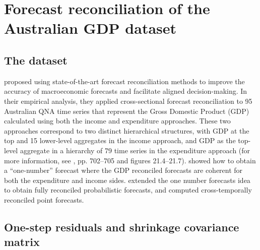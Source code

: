 \documentclass[a4paper,11pt]{article}
\theoremstyle{definition}
\begin{document}
\begin{table}[H]
	\centering
	\begingroup
	\fontsize{9}{11}\selectfont
	
	\endgroup
	\caption{Simulation experiment. ES ratio indices defined in Section 5. %
	Approaches performing worse than the benchmark (bootstrap base forecasts, ctjb) are highlighted in red, the best for each column is marked in bold, and the overall lowest value is highlighted in blue. The reconciliation approaches are described in Table 2.}
	\label{tab:ar2es_app_shr}
\end{table}

\newpage
\section{Forecast reconciliation of the Australian GDP dataset}

\subsection{The dataset}
\cite{athanasopoulos2020} proposed using state-of-the-art forecast reconciliation methods to improve the accuracy of macroeconomic forecasts and facilitate aligned decision-making. 
In their empirical analysis, they applied cross-sectional forecast reconciliation to 95 Australian QNA time series that represent the Gross Domestic Product (GDP) calculated using both the income and expenditure approaches. These two approaches correspond to two distinct hierarchical structures, with GDP at the top and 15 lower-level aggregates in the income approach, and GDP as the top-level aggregate in a hierarchy of 79 time series in the expenditure approach (for more information, see \citealp{athanasopoulos2020}, pp. 702--705 and figures 21.4--21.7).
\cite{bisaglia2020} showed how to obtain a ``one-number'' forecast where the GDP reconciled forecasts are coherent for both the expenditure and income sides.
\cite{difonzo2022c, giro2022} extended the one number forecasts idea to obtain fully reconciled probabilistic forecasts, and \cite{difonzo2023} computed cross-temporally reconciled point forecasts. 

\subsection{One-step residuals and shrinkage covariance matrix}
\begin{table}[H]
	\centering
	\begingroup
	\fontsize{8}{10}\selectfont
	
	\endgroup
	\caption{$\overline{RelCRPS}$ indices defined in Section 5 for the Australian QNA dataset. %
	Approaches performing worse than the benchmark (bootstrap base forecasts, ctjb) are highlighted in red, the best for each column is marked in bold, and the overall lowest value is highlighted in blue. The reconciliation approaches are described in Table 2.}
	\label{tab:auscrps}
\end{table}
\end{document}
